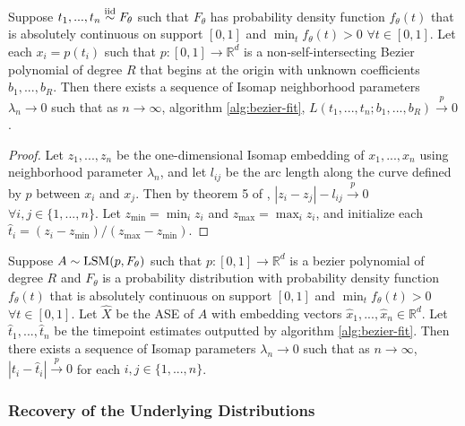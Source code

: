 \documentclass[12pt]{article}
\begin{document}
\begin{lemma}
\label{lem:lsm-noiseless}
Suppose $t_1, ..., t_n \stackrel{\mathrm{iid}}{\sim} F_\theta$ such that $F_\theta$ has probability density function $f_\theta(t)$ that is absolutely continuous on support $[0, 1]$ and $\min_t f_\theta(t) > 0$ $\forall t \in [0, 1]$. 
Let each $x_i = p(t_i)$ such that $p: [0, 1] \to \mathbb{R}^d$ is a non-self-intersecting Bezier polynomial of degree $R$ that begins at the origin with unknown coefficients $b_1, ..., b_R$. 
Then there exists a sequence of Isomap neighborhood parameters $\lambda_n \to 0$ such that as $n \to \infty$, algorithm \ref{alg:bezier-fit}, $L(t_1, ..., t_n; b_1, ..., b_R) \stackrel{p}{\to} 0$.
\end{lemma}

\begin{proof}
Let $z_1, ..., z_n$ be the one-dimensional Isomap embedding of $x_1, ..., x_n$ using neighborhood parameter $\lambda_n$, and let $l_{ij}$ be the arc length along the curve defined by $p$ between $x_i$ and $x_j$. 
Then by theorem 5 of \citet{acharyya2023}, $|z_i - z_j| - l_{ij} \stackrel{p}{\to} 0$ $\forall i, j \in \{1, ...,n\}$. 
Let $z_{\min} = \min_i z_i$ and $z_{\max} = \max_i z_i$, and initialize each $\hat{t}_i = (z_i - z_{\min}) / (z_{\max} - z_{\min})$. 
\end{proof}

\begin{theorem}
Suppose $A \sim \mathrm{LSM}(p, F_\theta)$ such that $p : [0, 1] \to \mathbb{R}^d$ is a bezier polynomial of degree $R$ and $F_\theta$ is a probability distribution with probability density function $f_\theta(t)$ that is absolutely continuous on support $[0, 1]$ and $\min_t f_\theta(t) > 0$ $\forall t \in [0, 1]$. 
Let $\hat{X}$ be the ASE of $A$ with embedding vectors $\hat{x}_1, ..., \hat{x}_n \in \mathbb{R}^d$. 
Let $\hat{t}_1, ..., \hat{t}_n$ be the timepoint estimates outputted by algorithm \ref{alg:bezier-fit}. 
Then there exists a sequence of Isomap parameters $\lambda_n \to 0$ such that as $n \to \infty$, $|t_i - \hat{t}_i| \stackrel{p}{\to} 0$ for each $i, j \in \{1, ..., n\}$. 
\end{theorem}

\hypertarget{recovery-of-the-underlying-distributions}{%
\subsubsection{Recovery of the Underlying
Distributions}\label{recovery-of-the-underlying-distributions}}
\end{document}
